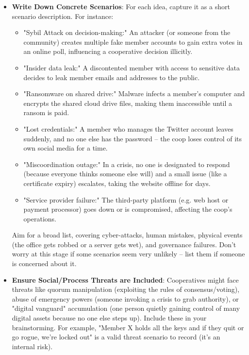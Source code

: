 \begin{itemize}
    \item \textbf{Write Down Concrete Scenarios}:
    For each idea, capture it as a short scenario description. For instance:

    \begin{itemize}
        \item "Sybil Attack on decision-making:" An attacker (or someone from the community) creates multiple
        fake member accounts to gain extra votes in an online poll, influencing a cooperative decision illicitly.
        \item "Insider data leak:" A discontented member with access to sensitive data decides to leak member
        emails and addresses to the public.
        \item "Ransomware on shared drive:" Malware infects a member's computer and encrypts the shared cloud
        drive files, making them inaccessible until a ransom is paid.
        \item "Lost credentials:" A member who manages the Twitter account leaves suddenly, and no one else has
        the password – the coop loses control of its own social media for a time.
        \item "Miscoordination outage:" In a crisis, no one is designated to respond (because everyone thinks
        someone else will) and a small issue (like a certificate expiry) escalates, taking the website offline
        for days.
        \item "Service provider failure:" The third-party platform (e.g. web host or payment processor) goes
        down or is compromised, affecting the coop's operations.
    \end{itemize}

    Aim for a broad list, covering cyber-attacks, human mistakes, physical events
    (the office gets robbed or a server gets wet), and governance failures. Don't
    worry at this stage if some scenarios seem very unlikely – list them if someone
    is concerned about it.

    \item \textbf{Ensure Social/Process Threats are Included}:
    Cooperatives might face threats like quorum manipulation (exploiting the rules
    of consensus/voting), abuse of emergency powers (someone invoking a crisis to
    grab authority), or "digital vanguard" accumulation (one person quietly gaining
    control of many digital assets because no one else steps up). Include these in
    your brainstorming. For example, "Member X holds all the keys and if they quit
    or go rogue, we're locked out" is a valid threat scenario to record (it's an
    internal risk).

\end{itemize}

